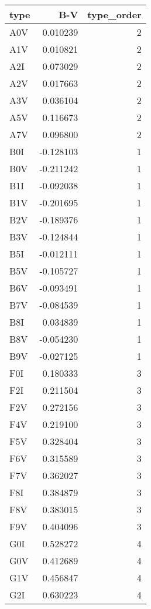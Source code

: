 \begin{tabular}{lrr}
\toprule
type &       B-V &  type\_order \\
\midrule
 A0V &  0.010239 &           2 \\
 A1V &  0.010821 &           2 \\
 A2I &  0.073029 &           2 \\
 A2V &  0.017663 &           2 \\
 A3V &  0.036104 &           2 \\
 A5V &  0.116673 &           2 \\
 A7V &  0.096800 &           2 \\
 B0I & -0.128103 &           1 \\
 B0V & -0.211242 &           1 \\
 B1I & -0.092038 &           1 \\
 B1V & -0.201695 &           1 \\
 B2V & -0.189376 &           1 \\
 B3V & -0.124844 &           1 \\
 B5I & -0.012111 &           1 \\
 B5V & -0.105727 &           1 \\
 B6V & -0.093491 &           1 \\
 B7V & -0.084539 &           1 \\
 B8I &  0.034839 &           1 \\
 B8V & -0.054230 &           1 \\
 B9V & -0.027125 &           1 \\
 F0I &  0.180333 &           3 \\
 F2I &  0.211504 &           3 \\
 F2V &  0.272156 &           3 \\
 F4V &  0.219100 &           3 \\
 F5V &  0.328404 &           3 \\
 F6V &  0.315589 &           3 \\
 F7V &  0.362027 &           3 \\
 F8I &  0.384879 &           3 \\
 F8V &  0.383015 &           3 \\
 F9V &  0.404096 &           3 \\
 G0I &  0.528272 &           4 \\
 G0V &  0.412689 &           4 \\
 G1V &  0.456847 &           4 \\
 G2I &  0.630223 &           4 \\

\end{tabular}
